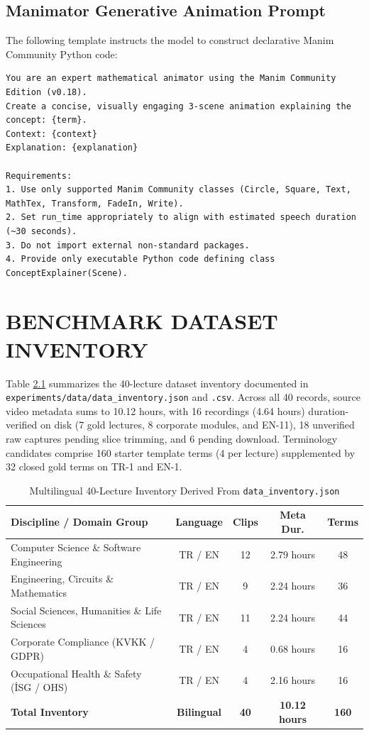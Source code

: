 \documentclass[a4paper,12pt]{report}
\begin{document}
\section{Manimator Generative Animation Prompt}
The following template instructs the model to construct declarative Manim Community Python code:

\begin{lstlisting}
You are an expert mathematical animator using the Manim Community Edition (v0.18).
Create a concise, visually engaging 3-scene animation explaining the concept: {term}.
Context: {context}
Explanation: {explanation}

Requirements:
1. Use only supported Manim Community classes (Circle, Square, Text, MathTex, Transform, FadeIn, Write).
2. Set run_time appropriately to align with estimated speech duration (~30 seconds).
3. Do not import external non-standard packages.
4. Provide only executable Python code defining class ConceptExplainer(Scene).
\end{lstlisting}


\chapter{BENCHMARK DATASET INVENTORY}
\label{app:dataset}

Table \ref{table:dataset_summary} summarizes the 40-lecture dataset inventory documented in \texttt{experiments/data/data\_inventory.json} and \texttt{.csv}. Across all 40 records, source video metadata sums to 10.12 hours, with 16 recordings (4.64 hours) duration-verified on disk (7 gold lectures, 8 corporate modules, and EN-11), 18 unverified raw captures pending slice trimming, and 6 pending download. Terminology candidates comprise 160 starter template terms (4 per lecture) supplemented by 32 closed gold terms on TR-1 and EN-1.

\begin{table}[h!]
\centering
\caption{Multilingual 40-Lecture Inventory Derived From \texttt{data\_inventory.json}}
\label{table:dataset_summary}
\baselineskip
\footnotesize
\setlength{\tabcolsep}{4pt}
\begin{tabular}{|p{7.2cm}|c|c|c|c|}
\hline
\textbf{Discipline / Domain Group} & \textbf{Language} & \textbf{Clips} & \textbf{Meta Dur.} & \textbf{Terms} \\ \hline
Computer Science \& Software Engineering & TR / EN & 12 & 2.79 hours & 48 \\ \hline
Engineering, Circuits \& Mathematics & TR / EN & 9 & 2.24 hours & 36 \\ \hline
Social Sciences, Humanities \& Life Sciences & TR / EN & 11 & 2.24 hours & 44 \\ \hline
Corporate Compliance (KVKK / GDPR) & TR / EN & 4 & 0.68 hours & 16 \\ \hline
Occupational Health \& Safety (İSG / OHS) & TR / EN & 4 & 2.16 hours & 16 \\ \hline
\textbf{Total Inventory} & \textbf{Bilingual} & \textbf{40} & \textbf{10.12 hours} & \textbf{160} \\ \hline
\end{tabular}
\end{table}
\end{document}
